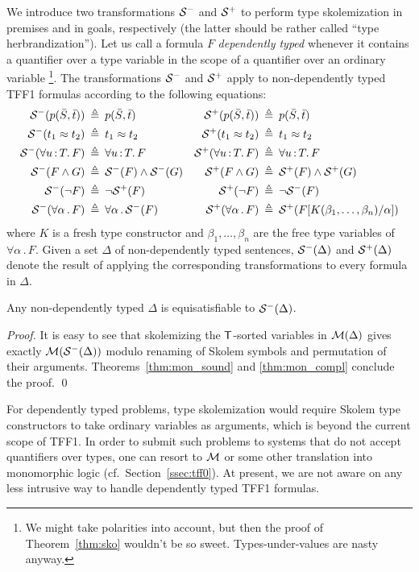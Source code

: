We introduce two transformations $\mathcal{S}^-$ and $\mathcal{S}^+$ to
perform type skolemization in premises and in goals, respectively
(the latter should be rather called ``type herbrandization'').
Let us call a formula $F$ {\em dependently typed} whenever
it contains a quantifier over a type variable in the scope
of a quantifier over an ordinary variable%
\footnote{We might take polarities into account, but then
the proof of Theorem~\ref{thm:sko} wouldn't be so sweet.
Types-under-values are nasty anyway.}.
The transformations $\mathcal{S}^-$ and $\mathcal{S}^+$ apply to
non-dependently typed TFF1 formulas according to the
following equations:
\begin{align*}
\mathcal{S}^-(p(\bar{S},\bar{t})) &\:\triangleq\: p(\bar{S},\bar{t}) &
\mathcal{S}^+(p(\bar{S},\bar{t})) &\:\triangleq\: p(\bar{S},\bar{t}) \\
\mathcal{S}^-(t_1 \approx t_2) &\:\triangleq\: t_1 \approx t_2 &
\mathcal{S}^+(t_1 \approx t_2) &\:\triangleq\: t_1 \approx t_2 \\
\mathcal{S}^-(\forall u \operatorname{:} T .\, F) &\:\triangleq\: \forall u \operatorname{:} T .\, F &
\mathcal{S}^+(\forall u \operatorname{:} T .\, F) &\:\triangleq\: \forall u \operatorname{:} T .\, F \\
\mathcal{S}^-(F \land G) &\:\triangleq\: \mathcal{S}^-(F) \land \mathcal{S}^-(G) &
\mathcal{S}^+(F \land G) &\:\triangleq\: \mathcal{S}^+(F) \land \mathcal{S}^+(G) \\
\mathcal{S}^-(\lnot F) &\:\triangleq\: \lnot \mathcal{S}^+(F) &
\mathcal{S}^+(\lnot F) &\:\triangleq\: \lnot \mathcal{S}^-(F) \\
\mathcal{S}^-(\forall \alpha \,.\, F) &\:\triangleq\: \forall \alpha \,.\, \mathcal{S}^-(F) &
\mathcal{S}^+(\forall \alpha \,.\, F) &\:\triangleq\:
\mathcal{S}^+(F[K(\beta_1,\dots,\beta_n)/\alpha])
\end{align*}
where $K$ is a fresh type constructor and $\beta_1,\dots,\beta_n$ are
the free type variables of $\forall \alpha \,.\, F$.
Given a set $\Delta$ of non-dependently typed sentences,
$\mathcal{S}^-(\Delta)$ and $\mathcal{S}^+(\Delta)$ denote the result of applying
the corresponding transformations to every formula in $\Delta$.

\begin{theorem} \label{thm:sko}
Any non-dependently typed $\Delta$ is equisatisfiable to $\mathcal{S}^-(\Delta)$.
\end{theorem}
\begin{proof}
It is easy to see that
skolemizing the $\mathsf{T}$-sorted variables in $\mathcal{M}(\Delta)$ gives
exactly $\mathcal{M}(\mathcal{S}^-(\Delta))$ modulo renaming of Skolem symbols and
permutation of their arguments. Theorems~\ref{thm:mon_sound} and
\ref{thm:mon_compl} conclude the proof.
\qed
\end{proof}

For dependently typed problems, type skolemization would require
Skolem type constructors to take ordinary variables as arguments,
which is beyond the current scope of TFF1. In order to submit such
problems to systems that do not accept quantifiers over types,
one can resort to $\mathcal{M}$ or some other translation into monomorphic
logic (cf.~Section~\ref{ssec:tff0}). At present, we are not aware
on any less intrusive way to handle dependently typed TFF1 formulas.

